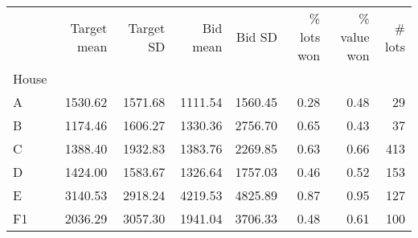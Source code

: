 \begin{tabular}{lrrrrrrr}
\toprule
{} &  Target mean &  Target SD &  Bid mean &  Bid SD &  \% lots won &  \% value won &  \# lots \\
House &              &            &           &         &             &              &         \\
\midrule
A     &      1530.62 &    1571.68 &   1111.54 & 1560.45 &        0.28 &         0.48 &      29 \\
B     &      1174.46 &    1606.27 &   1330.36 & 2756.70 &        0.65 &         0.43 &      37 \\
C     &      1388.40 &    1932.83 &   1383.76 & 2269.85 &        0.63 &         0.66 &     413 \\
D     &      1424.00 &    1583.67 &   1326.64 & 1757.03 &        0.46 &         0.52 &     153 \\
E     &      3140.53 &    2918.24 &   4219.53 & 4825.89 &        0.87 &         0.95 &     127 \\
F1    &      2036.29 &    3057.30 &   1941.04 & 3706.33 &        0.48 &         0.61 &     100 \\
\bottomrule
\end{tabular}

